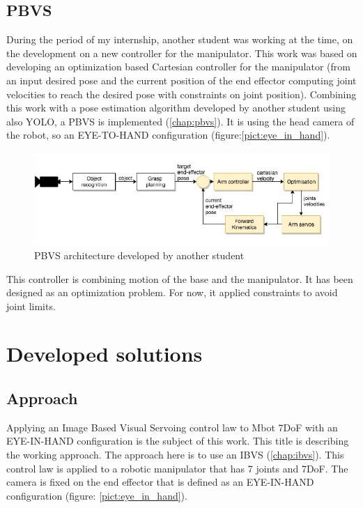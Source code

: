 \subsection{PBVS}

During the period of my internship, another student was working at the time, on the development on a new controller for the manipulator. This work was based on developing an optimization based Cartesian controller for the manipulator (from an input desired pose and the current position of the end effector computing joint velocities to reach the desired pose with constraints on joint position). Combining this work with a pose estimation algorithm developed by another student using also YOLO, a \gls{PBVS} is implemented (\ref{chap:pbvs}). It is using the head camera of the robot, so an EYE-TO-HAND configuration (figure:\ref{pict:eye_in_hand}).
\begin{figure} [!ht]
    \centering
    \includegraphics[width=0.95\linewidth]{images/pbvs.png}
    \caption{PBVS architecture developed by another student}
    \label{pict:pbvs_emilia}
\end{figure}

This controller is combining motion of the base and the manipulator. It has been designed as an optimization problem. For now, it applied constraints to avoid joint limits.

\section{Developed solutions}
\label{developed_solution}

\subsection{Approach}
Applying an Image Based Visual Servoing control law to Mbot 7DoF with an EYE-IN-HAND configuration is the subject of this work. This title is describing the working approach. The approach here is to use an \gls{IBVS} (\ref{chap:ibvs}). This control law is applied to a robotic manipulator that has 7 joints and 7\gls{DoF}. The camera is fixed on the end effector that is defined as an EYE-IN-HAND configuration (figure: \ref{pict:eye_in_hand}).
